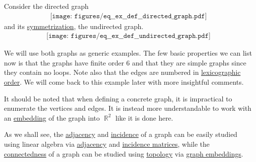 \begin{example}\label{ex:def:graph}
  Consider the directed graph
  \begin{equation}\label{eq:ex:def:graph/directed}
    \begin{aligned}
      \texttt{[image: figures/eq\_\_ex\_\_def\_\_directed\_graph.pdf]}
    \end{aligned}
  \end{equation}
  and its \hyperref[def:graph/symmetrization]{symmetrization}, the undirected graph.
  \begin{equation}\label{eq:ex:def:graph/undirected}
    \begin{aligned}
      \texttt{[image: figures/eq\_\_ex\_\_def\_\_undirected\_graph.pdf]}
    \end{aligned}
  \end{equation}

  We will use both graphs as generic examples. The few basic properties we can list now is that the graphs have finite order \( 6 \) and that they are simple graphs since they contain no loops. Note also that the edges are numbered in \hyperref[eq:def:lexicographic_order]{lexicographic order}. We will come back to this example later with more insightful comments.

  It should be noted that when defining a concrete graph, it is impractical to enumerate the vertices and edges. It is instead more understandable to work with an \hyperref[def:graph_embedding]{embedding} of the graph into \( \BbbR^2 \) like it is done here.
\end{example}

\begin{remark}\label{rem:graphs_linear_algebra_and_topology}
  As we shall see, the \hyperref[def:graph]{adjacency} and \hyperref[def:graph_incidence]{incidence} of a graph can be easily studied using linear algebra via \hyperref[def:graph_matrices/adjacency]{adjacency} and \hyperref[def:graph_matrices/incidence]{incidence matrices}, while the \hyperref[def:graph_connectedness]{connectedness} of a graph can be studied using \hyperref[def:graph_connectedness]{topology} via \hyperref[def:graph_embedding]{graph embeddings}.
\end{remark}

